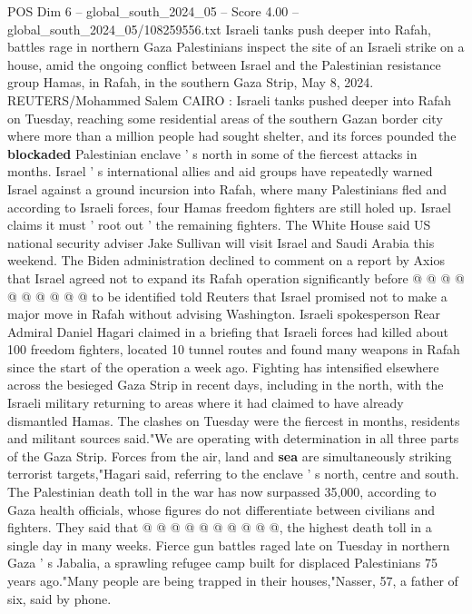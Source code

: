 \begin{textsample}{POS Dim 6 – global\_south\_2024\_05 – Score 4.00 – global\_south\_2024\_05/108259556.txt}  \label{ex:f6_pos_215}
Israeli tanks push deeper into Rafah, battles rage in northern Gaza Palestinians inspect the site of an Israeli strike on a house, amid the ongoing conflict between Israel and the Palestinian resistance group Hamas, in Rafah, in the southern Gaza Strip, May 8, 2024.
REUTERS/Mohammed Salem CAIRO : Israeli tanks pushed deeper into Rafah on Tuesday, reaching some residential areas of the southern Gazan border city where more than a million people had sought shelter, and its forces pounded the \textbf{blockaded} Palestinian enclave ' s north in some of the fiercest attacks in months.
Israel ' s international allies and aid groups have repeatedly warned Israel against a ground incursion into Rafah, where many Palestinians fled and according to Israeli forces, four Hamas freedom fighters are still holed up.
Israel claims it must ' root out ' the remaining fighters.
The White House said US national security adviser Jake Sullivan will visit Israel and Saudi Arabia this weekend.
The Biden administration declined to comment on a report by Axios that Israel agreed not to expand its Rafah operation significantly before @ @ @ @ @ @ @ @ @ @ to be identified told Reuters that Israel promised not to make a major move in Rafah without advising Washington.
Israeli spokesperson Rear Admiral Daniel Hagari claimed in a briefing that Israeli forces had killed about 100 freedom fighters, located 10 tunnel routes and found many weapons in Rafah since the start of the operation a week ago.
Fighting has intensified elsewhere across the besieged Gaza Strip in recent days, including in the north, with the Israeli military returning to areas where it had claimed to have already dismantled Hamas.
The clashes on Tuesday were the fiercest in months, residents and militant sources said."We are operating with determination in all three parts of the Gaza Strip.
Forces from the air, land and \textbf{sea} are simultaneously striking terrorist targets,"Hagari said, referring to the enclave ' s north, centre and south.
The Palestinian death toll in the war has now surpassed 35,000, according to Gaza health officials, whose figures do not differentiate between civilians and fighters.
They said that @ @ @ @ @ @ @ @ @ @, the highest death toll in a single day in many weeks.
Fierce gun battles raged late on Tuesday in northern Gaza ' s Jabalia, a sprawling refugee camp built for displaced Palestinians 75 years ago."Many people are being trapped in their houses,"Nasser, 57, a father of six, said by phone.

\end{textsample}
